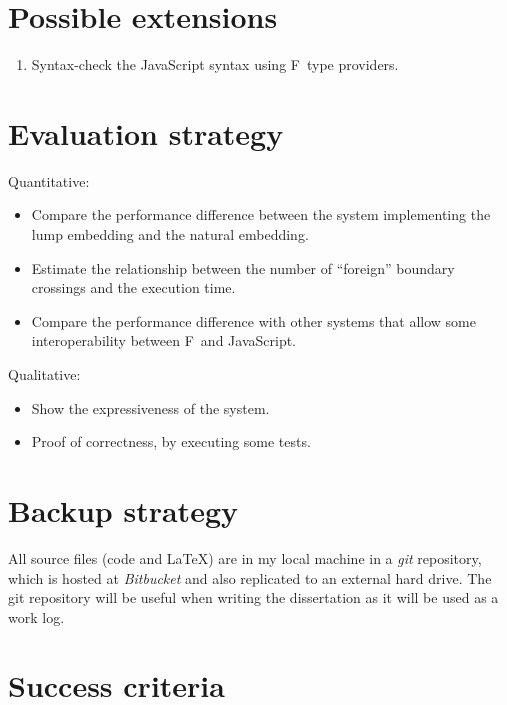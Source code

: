 \documentclass[12pt,a4paper]{article} \usepackage{a4wide}
\newcommand{\fs}{F\nolinebreak\hspace{-.05em}\raisebox{.6ex}{\tiny\bf
    \#}}
\begin{document}
\section{Possible extensions}
\begin{enumerate}
\item Syntax-check the JavaScript syntax using \fs\ type providers.
\end{enumerate}

\section{Evaluation strategy}

Quantitative:
\begin{itemize}
\item Compare the performance difference between the system
  implementing the lump embedding and the natural embedding.
\item Estimate the relationship between the number of “foreign”
  boundary crossings and the execution time.
\item Compare the performance difference with other systems that allow
  some interoperability between \fs\ and JavaScript.
\end{itemize}

Qualitative:
\begin{itemize}
\item Show the expressiveness of the system.
\item Proof of correctness, by executing some tests.
\end{itemize}


\section{Backup strategy}

All source files (code and \LaTeX) are in my
local machine in a \emph{git} repository, which is hosted at
\emph{Bitbucket} and also replicated to an external hard drive.  The
git repository will be useful when writing the dissertation as it will
be used as a work log.

\section{Success criteria}
\end{document}
